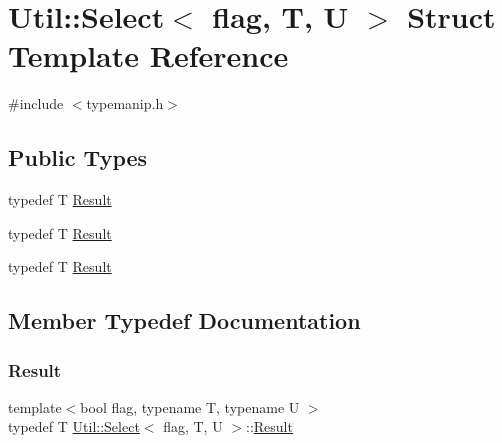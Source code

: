 \hypertarget{structUtil_1_1Select}{}\section{Util\+:\+:Select$<$ flag, T, U $>$ Struct Template Reference}
\label{structUtil_1_1Select}


{\ttfamily \#include $<$typemanip.\+h$>$}

\subsection*{Public Types}
\begin{DoxyCompactItemize}
\item 
typedef T \mbox{\hyperlink{structUtil_1_1Select_a2b5640609685e97b25f3ec1ce967f745}{Result}}
\item 
typedef T \mbox{\hyperlink{structUtil_1_1Select_a2b5640609685e97b25f3ec1ce967f745}{Result}}
\item 
typedef T \mbox{\hyperlink{structUtil_1_1Select_a2b5640609685e97b25f3ec1ce967f745}{Result}}
\end{DoxyCompactItemize}


\subsection{Member Typedef Documentation}
\mbox{\label{structUtil_1_1Select_a2b5640609685e97b25f3ec1ce967f745}} 
\subsubsection{\texorpdfstring{Result}{Result}\hspace{0.1cm}{\footnotesize\ttfamily [1/3]}}
{\footnotesize\ttfamily template$<$bool flag, typename T, typename U $>$ \\
typedef T \mbox{\hyperlink{structUtil_1_1Select}{Util\+::\+Select}}$<$ flag, T, U $>$\+::\mbox{\hyperlink{structUtil_1_1Select_a2b5640609685e97b25f3ec1ce967f745}{Result}}}

\mbox{\label{structUtil_1_1Select_a2b5640609685e97b25f3ec1ce967f745}} 
